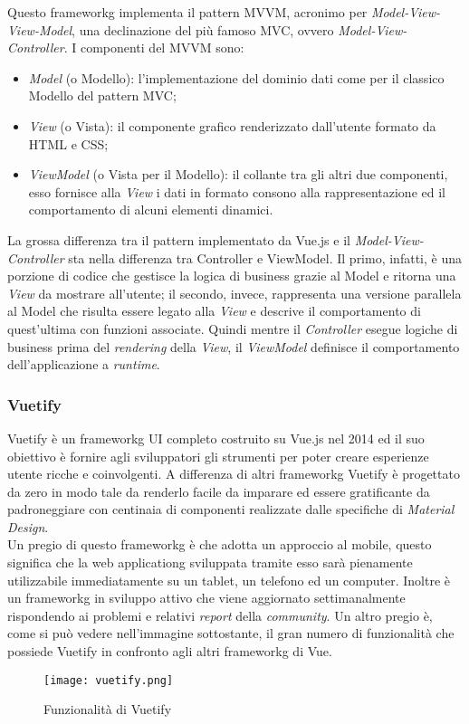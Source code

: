 Questo \gls{frameworkg} implementa il pattern MVVM, acronimo per \textit{Model-View-View-Model}, una declinazione del più famoso MVC, ovvero \textit{Model-View-Controller}. I componenti del MVVM sono:
\begin{itemize}
	\item \textit{Model} (o Modello): l'implementazione del dominio dati come per il classico Modello del pattern MVC;
	\item \textit{View} (o Vista): il componente grafico renderizzato dall'utente formato da HTML e CSS;
	\item \textit{ViewModel} (o Vista per il Modello): il collante tra gli altri due componenti, esso fornisce alla \textit{View} i dati in formato consono alla rappresentazione ed il comportamento di alcuni elementi dinamici.
\end{itemize}
La grossa differenza tra il pattern implementato da Vue.js e il \textit{Model-View-Controller} sta nella differenza tra Controller e ViewModel. Il primo, infatti, è una porzione di codice che gestisce la logica di business grazie al Model e ritorna una \textit{View} da mostrare all'utente; il secondo, invece, rappresenta una versione parallela al Model che risulta essere legato alla \textit{View} e descrive il comportamento di quest'ultima con funzioni associate. Quindi mentre il \textit{Controller} esegue logiche di business prima del \textit{rendering} della \textit{View}, il \textit{ViewModel} definisce il comportamento dell'applicazione a \textit{runtime}.

\subsubsection{Vuetify}
\label{subsubsec:vuetify}

Vuetify è un \gls{frameworkg} UI completo costruito su Vue.js nel 2014 ed il suo obiettivo è fornire agli sviluppatori gli strumenti per poter creare esperienze utente ricche e coinvolgenti. A differenza di altri \gls{frameworkg} Vuetify è progettato da zero in modo tale da renderlo facile da imparare ed essere gratificante da padroneggiare con centinaia di componenti realizzate dalle specifiche di \textit{Material Design}.\\
Un pregio di questo \gls{frameworkg} è che adotta un approccio al mobile, questo significa che la \gls{web applicationg} sviluppata tramite esso sarà pienamente utilizzabile immediatamente su un tablet, un telefono ed un computer. Inoltre è un \gls{frameworkg} in sviluppo attivo che viene aggiornato settimanalmente rispondendo ai problemi e relativi \textit{report} della \textit{community}. Un altro pregio è, come si può vedere nell'immagine sottostante, il gran numero di funzionalità che possiede Vuetify in confronto agli altri \gls{frameworkg} di Vue.
\begin{figure}[H]
	\begin{center}
		\texttt{[image: vuetify.png]}
		\caption{Funzionalità di Vuetify}
	\end{center}
\end{figure}

